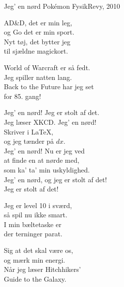 \begin{song}{Jeg' en nørd}
  {} %
  {Pokémon} %
  {} %
  {FysikRevy, 2010} %
  {\NotCCLIed} %

  \begin{SBVerse}
    AD\&D, det er min leg,\\
    og Go det er min sport.\\
    Nyt tøj, det bytter jeg\\
    til sjældne magickort.
  \end{SBVerse}

  \begin{SBVerse}
    World of Warcraft er så fedt.\\
    Jeg spiller natten lang.\\
    Back to the Future har jeg set\\
    for 85. gang!
  \end{SBVerse}

  \begin{SBChorus}
    Jeg' en nørd! Jeg er stolt af det.\\
    Jeg læser XKCD. Jeg' en nørd!\\
    Skriver i \LaTeX,\\
    og jeg tænder på $dx$.\\\medskip
    Jeg' en nørd! Nu er jeg ved\\
    at finde en at nørde med,\\
    som ka’ ta’ min uskyldighed.\\
    Jeg' en nørd, og jeg er stolt af det!\\\medskip
    Jeg er stolt af det!
  \end{SBChorus}

  \begin{SBVerse}
    Jeg er level 10 i sværd,\\
    så spil nu ikke smart.\\
    I min bæltetaske er\\
    der terninger parat.
  \end{SBVerse}

  \begin{SBVerse}
    Sig at det skal være os,\\
    og mærk min energi.\\
    Når jeg læser Hitchhikers’\\
    Guide to the Galaxy.
  \end{SBVerse}


\end{song}

